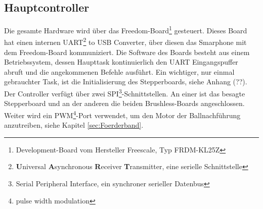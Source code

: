 		
    \subsection{Hauptcontroller}
        Die gesamte Hardware wird über das Freedom-Board\footnote{Development-Board vom 
        Hersteller Freescale, Typ FRDM-KL25Z} gesteuert. Dieses Board hat einen internen UART\footnote{\textbf{U}niversal \textbf{A}synchronous \textbf{R}eceiver 
        \textbf{T}ransmitter, eine serielle Schnittstelle} to USB Converter, über diesen 
        das Smarphone mit dem Freedom-Board kommuniziert. Die Software des Boards besteht aus einem 
        Betriebssystem, dessen Haupttask kontinuierlich den UART Eingangspuffer abruft 
        und die angekommenen Befehle ausführt. Ein wichtiger, nur einmal gebrauchter Task, 
        ist die Initialisierung des Stepperboards, siehe Anhang (??). Der Controller 
        verfügt über zwei SPI\footnote{Serial Peripheral Interface, ein synchroner serieller Datenbus }-Schnittstellen. An einer ist das besagte Stepperboard und 
        an der anderen die beiden Brushless-Boards angeschlossen. Weiter wird ein PWM\footnote{pulse width modulation}-Port 
        verwendet, um den Motor der Ballnachführung anzutreiben, siehe Kapitel 
        \ref{sec:Foerderband}.  

   
